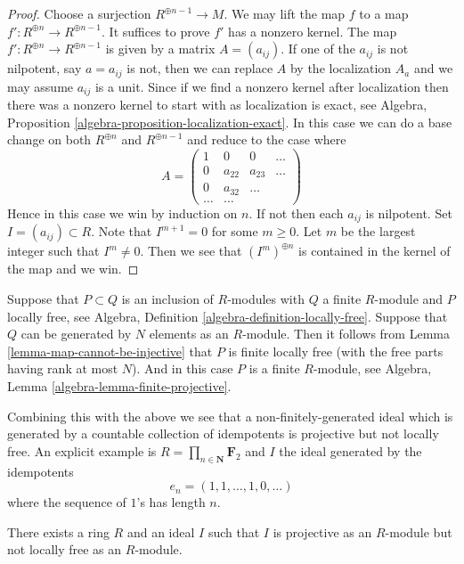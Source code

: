 \begin{proof}
Choose a surjection $R^{\oplus n - 1} \to M$.
We may lift the map $f$ to a map $f' : R^{\oplus n} \to R^{\oplus n - 1}$.
It suffices to prove $f'$ has a nonzero kernel.
The map $f' : R^{\oplus n} \to R^{\oplus n - 1}$ is given by a
matrix $A = (a_{ij})$. If one of the $a_{ij}$ is not nilpotent, say
$a = a_{ij}$ is not, then we can replace $A$ by the localization $A_a$
and we may assume $a_{ij}$ is a unit. Since if we find a nonzero kernel
after localization then there was a nonzero kernel to start with as
localization is exact, see
Algebra, Proposition \ref{algebra-proposition-localization-exact}.
In this case we can do a base change on both $R^{\oplus n}$
and $R^{\oplus n - 1}$ and reduce to the case where
$$
A =
\left(
\begin{matrix}
1 & 0 & 0 & \ldots \\
0 & a_{22} & a_{23} & \ldots \\
0 & a_{32} & \ldots \\
\ldots & \ldots
\end{matrix}
\right)
$$
Hence in this case we win by induction on $n$. If not then each
$a_{ij}$ is nilpotent. Set $I = (a_{ij}) \subset R$. Note that
$I^{m + 1} = 0$ for some $m \geq 0$. Let $m$ be the largest integer
such that $I^m \not = 0$. Then we see that $(I^m)^{\oplus n}$ is
contained in the kernel of the map and we win.
\end{proof}

\noindent
Suppose that $P \subset Q$ is an inclusion of $R$-modules with $Q$ a
finite $R$-module and $P$ locally free, see
Algebra, Definition \ref{algebra-definition-locally-free}.
Suppose that $Q$ can be generated by $N$ elements as an $R$-module.
Then it follows from
Lemma \ref{lemma-map-cannot-be-injective}
that $P$ is finite locally free (with the free parts having rank
at most $N$). And in this case $P$ is a finite $R$-module, see
Algebra, Lemma \ref{algebra-lemma-finite-projective}.

\medskip\noindent
Combining this with the above we see that a non-finitely-generated
ideal which is generated by a countable collection of idempotents
is projective but not locally free. An explicit example is
$R = \prod_{n \in \mathbf{N}} \mathbf{F}_2$ and
$I$ the ideal generated by the idempotents
$$
e_n = (1, 1, \ldots, 1, 0, \ldots )
$$
where the sequence of $1$'s has length $n$.

\begin{lemma}
\label{lemma-ideal-projective-not-locally-free}
There exists a ring $R$ and an ideal $I$ such that $I$ is projective as
an $R$-module but not locally free as an $R$-module.
\end{lemma}

